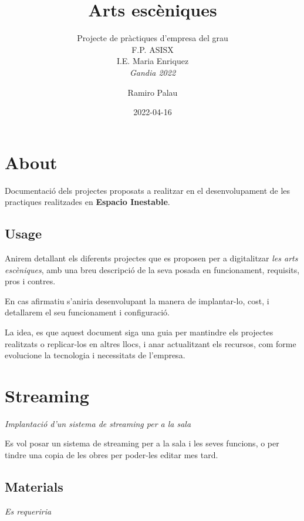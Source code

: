 \documentclass[
  10pt,
]{krantz}
\title{Arts escèniques}
\subtitle{Projecte de pràctiques d'empresa del grau\\
F.P. ASISX\\
I.E. Maria Enriquez\\
\emph{Gandia 2022}}
\author{Ramiro Palau}
\date{2022-04-16}
\begin{document}
\maketitle

{
\hypersetup{linkcolor=}
\setcounter{tocdepth}{2}
\tableofcontents
}
\hypertarget{about}{%
\chapter*{About}\label{about}}


Documentació dels projectes proposats a realitzar en el desenvolupament de les practiques realitzades en \textbf{Espacio Inestable}.

\hypertarget{usage}{%
\section*{Usage}\label{usage}}


Anirem detallant els diferents projectes que es proposen per a digitalitzar \emph{les arts escèniques}, amb una breu descripció de la seva posada en funcionament, requisits, pros i contres.

En cas afirmatiu s'aniria desenvolupant la manera de implantar-lo, cost, i detallarem el seu funcionament i configuració.

La idea, es que aquest document siga una guia per mantindre els projectes realitzats o replicar-los en altres llocs, i anar actualitzant els recursos, com forme evolucione la tecnologia i necessitats de l'empresa.

\hypertarget{streaming}{%
\chapter{Streaming}\label{streaming}}

\emph{Implantació d'un sistema de streaming per a la sala}

Es vol posar un sistema de streaming per a la sala i les seves funcions, o per tindre una copia de les obres per poder-les editar mes tard.

\hypertarget{materials}{%
\section{Materials}\label{materials}}

\emph{Es requeriria}
\end{document}

